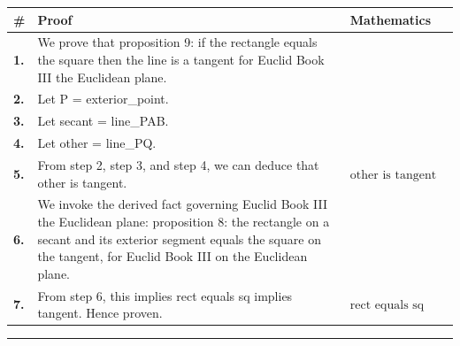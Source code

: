 \documentclass[11pt]{article}
\theoremstyle{definition}
\begin{document}
\begin{tabular}{@{} >{\raggedright\arraybackslash}p{} >{\raggedright\arraybackslash}p{} >{\raggedleft\arraybackslash}p{} @{}}
\textbf{\#} & \textbf{Proof} & \textbf{Mathematics} \\
\midrule
\textbf{1.} & We prove that proposition 9: if the rectangle equals the square then the line is a tangent for Euclid Book III the Euclidean plane. & \\[0.45em]
\textbf{2.} & Let P = exterior\_point. & \\[0.45em]
\textbf{3.} & Let secant = line\_PAB. & \\[0.45em]
\textbf{4.} & Let other = line\_PQ. & \\[0.45em]
\textbf{5.} & From step 2, step 3, and step 4, we can deduce that other is tangent. & $\displaystyle \text{other is tangent}$ \\[0.45em]
\textbf{6.} & We invoke the derived fact governing Euclid Book III the Euclidean plane: proposition 8: the rectangle on a secant and its exterior segment equals the square on the tangent, for Euclid Book III on the Euclidean plane. & \\[0.45em]
\textbf{7.} & From step 6, this implies rect equals sq implies tangent. Hence proven. & $\displaystyle \text{rect equals sq implies tangent}$ \\[0.45em]
\bottomrule
\end{tabular}
\label{thm:Geometry-Euclid Book III-proposition_9_if_the_rectangle_equals_the_square_then_the_line_is_a_tangent}
\par\medskip\hrule
\end{document}
